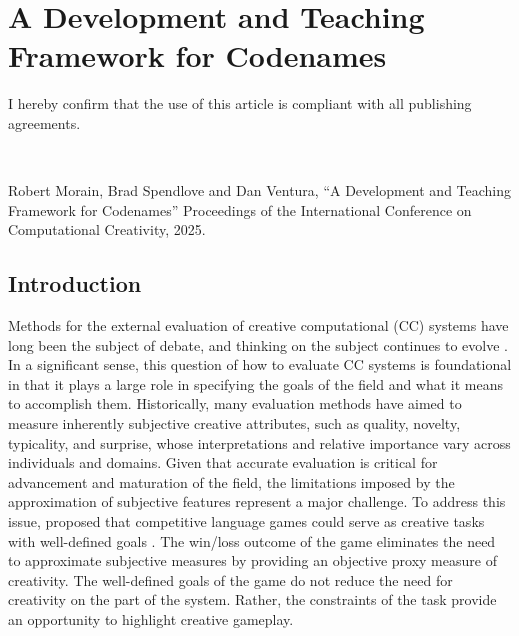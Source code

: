 \documentclass[phd,electronic,oneside,twosidetoc,letterpaper,chaptercenter,parttop,lof]{byumsphd}
\begin{document}
\chapter{A Development and Teaching Framework for Codenames} 
\label{chap:codenames} 

I hereby confirm that the use of this article is compliant with all publishing agreements.

\

\noindent
Robert Morain, Brad Spendlove and Dan Ventura, ``A Development and Teaching Framework for Codenames'' Proceedings of the International Conference on Computational Creativity, 2025.

\section{Introduction}

Methods for the external evaluation of creative computational (CC) systems have long been the subject of debate, and thinking on the subject continues to evolve \cite{ritchie07,pease2011face,jordanous2012standardised,bown2014,lamb2015,ventura2016mere,carnovalini2021,peeperkorn2023}.
In a significant sense, this question of how to evaluate CC systems is foundational in that it plays a large role in specifying the goals of the field and what it means to accomplish them.  Historically, many evaluation methods have aimed to measure inherently subjective creative attributes, such as quality, novelty, typicality, and surprise, whose interpretations and relative importance vary across individuals and domains. Given that accurate evaluation is critical for advancement and maturation of the field, the limitations imposed by the approximation of subjective features represent a major challenge.  To address this issue, \citeauthor{spendlove2022competitive} proposed that competitive language games could serve as creative tasks with well-defined goals \cite{spendlove2022competitive}. The win/loss outcome of the game eliminates the need to approximate subjective measures by providing an objective proxy measure of creativity. The well-defined goals of the game do not reduce the need for creativity on the part of the system. Rather, the constraints of the task provide an opportunity to highlight creative gameplay.
\end{document}
